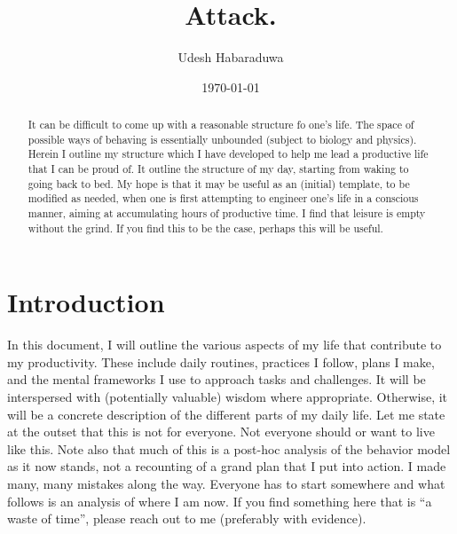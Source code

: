 \documentclass[10pt,twocolumn]{extarticle}
\title{Attack.}
\author{Udesh Habaraduwa}
\date{\today}
\begin{document}
\maketitle

\begin{abstract}

It can be difficult to come up with a reasonable structure fo one's life. The space of possible ways of behaving is essentially unbounded (subject to biology and physics). Herein I outline my structure which I have developed to help me lead a productive life that I can be proud of. It outline the structure of my day, starting from waking to going back to bed. My hope is that it may be useful as an (initial) template, to be modified as needed, when one is first attempting to engineer one's life in a conscious manner, aiming at accumulating hours of productive time. I find that leisure is empty without the grind. If you find this to be the case, perhaps this will be useful. 

\end{abstract}

\section{Introduction}
In this document, I will outline the various aspects of my life that contribute to my productivity. These include daily routines, practices I follow, plans I make, and the mental frameworks I use to approach tasks and challenges. It will be interspersed with (potentially valuable) wisdom where appropriate. Otherwise, it will be a concrete description of the different parts of my daily life. Let me state at the outset that this is not for everyone. Not everyone should or want to live like this. Note also that much of this is a post-hoc analysis of the behavior model as it now stands, not a recounting of a grand plan that I put into action. I made many, many mistakes along the way. Everyone has to start somewhere and what follows is an analysis of where I am now. If you find something here that is ``a waste of time'', please reach out to me (preferably with evidence). 
\end{document}
